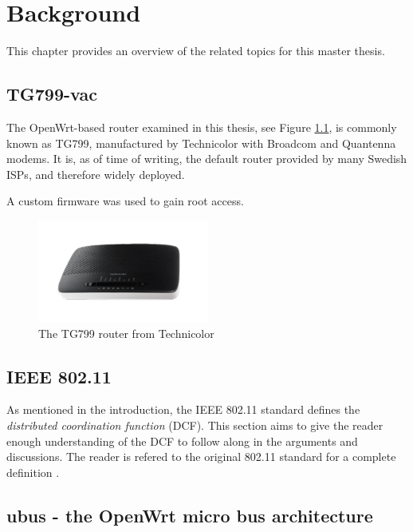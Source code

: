 
\chapter{Background}

This chapter provides an overview of the related topics for this master thesis.

\section{TG799-vac}

The OpenWrt-based router examined in this thesis, see Figure \ref{fig:tg799}, is
commonly known as TG799, manufactured by Technicolor with Broadcom and Quantenna
modems. It is, as of time of writing, the default router provided by many
Swedish ISPs, and therefore widely deployed.

A custom firmware was used to gain root access.

\begin{figure}
\center
\includegraphics[width=0.5\textwidth]{images/tg799.png}
\caption{The TG799 router from Technicolor}
\label{fig:tg799}
\end{figure}

\section{IEEE 802.11}

As mentioned in the introduction, the IEEE 802.11 standard defines the
\emph{distributed coordination function} (DCF). This section aims to give the
reader enough understanding of the DCF to follow along in the arguments and
discussions. The reader is refered to the original 802.11 standard for a
complete definition \cite{654749}.



\section{ubus - the OpenWrt micro bus architecture}

